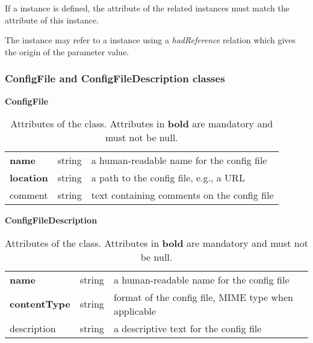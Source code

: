 If a  instance is defined, the  attribute of the related  instances must match the  attribute of this  instance.

The  instance may refer to a  instance using a \textit{hadReference} relation which gives the origin of the parameter value.


\subsubsection{ConfigFile and ConfigFileDescription classes}

\begin{table}[ht]
\small
{}\textwidth
 \textbf{\normalsize ConfigFile}\vspace{0.25em}\\
 \begin{tabulary}{1.0\textwidth}{llL}
 \toprule
  &    & \\
 \midrule
\textbf{name} &  string & a human-readable name for the config file \\
\textbf{location} & string  &  a path to the config file, e.g., a URL \\
comment & string  & text containing comments on the config file  \\
\bottomrule
\end{tabulary}
\caption[Attributes of the  class]{Attributes of the  class. Attributes in \textbf{bold} are mandatory and must not be null.}
\label{tab:configfile}
\end{table}

\begin{table}[ht]
\small
{}\textwidth
\textbf{\normalsize ConfigFileDescription}\vspace{0.25em}\\
\begin{tabulary}{1.0\textwidth}{llL}
 \toprule
  &    & \\
 \midrule
\textbf{name}    & string & a human-readable name for the config file \\
\textbf{contentType}  & string  & format of the config file, MIME type when applicable \\
description     & string  & a descriptive text for the config file \\
\bottomrule
\end{tabulary}
\caption[Attributes of the  class]{Attributes of the   class. Attributes in \textbf{bold} are mandatory and must not be null.}
\label{tab:configfiledescription}
\end{table}

